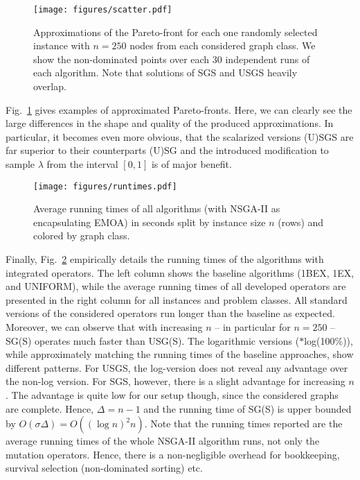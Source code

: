 \documentclass[twoside]{article}
\begin{document}
\begin{figure}[ht]
    \centering
    \texttt{[image: figures/scatter.pdf]}
    \caption{Approximations of the Pareto-front for each one randomly selected instance with $n = 250$ nodes from each considered graph class. We show the non-dominated points over each 30 independent runs of each algorithm. Note that solutions of SGS and USGS heavily overlap.}
    \label{fig:pareto_front_approximations}
\end{figure}

Fig.~\ref{fig:pareto_front_approximations} gives examples of approximated Pareto-fronts. Here, we can clearly see the large differences in the shape and quality of the produced approximations. In particular, it becomes even more obvious, that the scalarized versions (U)SGS are far superior to their counterparts (U)SG and the introduced modification to sample $\lambda$ from the interval $[0,1]$ is of major benefit.

\begin{figure}[t]
    \centering
    \texttt{[image: figures/runtimes.pdf]}
    \caption{Average running times of all algorithms (with NSGA-II as encapsulating EMOA) in seconds split by instance size $n$ (rows) and colored by graph class.}
    \label{fig:running_times}
\end{figure}

Finally, Fig.~\ref{fig:running_times} empirically details the running times of the algorithms with integrated operators. The left column shows the baseline algorithms (1BEX, 1EX, and UNIFORM), while the average running times of all developed operators are presented in the right column for all instances and problem classes. All standard versions of the considered operators run longer than the baseline as expected.
Moreover, we can observe that with increasing $n$ -- in particular for $n=250$ -- SG(S) operates much faster than USG(S). The logarithmic versions ($\ast$log(100\%)), while approximately matching the running times of the baseline approaches, show different patterns. For USGS, the log-version does not reveal any advantage over the non-log version. For SGS, however, there is a slight advantage for increasing $n$. The advantage is quite low for our setup though, since the considered graphs are complete. Hence, $\Delta = n-1$ and the running time of SG(S) is upper bounded by $O(\sigma \Delta) = O((\log n)^2 n)$. Note that the running times reported are the average running times of the whole NSGA-II algorithm runs, not only the mutation operators. Hence, there is a non-negligible overhead for bookkeeping, survival selection (non-dominated sorting) etc.
\end{document}
